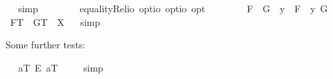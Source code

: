 \begin{isabellebody}
\isadelimproof
\ %
\endisadelimproof
%
\isatagproof
{}\isamarkupfalse%
\ simp\ \isamarkupfalse%
\ %
%
\endisatagproof
{\isafoldproof}%
%
\isadelimproof
%
\endisadelimproof
\ \ \isanewline
\isanewline
\ \isamarkupfalse%
\ equalityRel{}{\isacharcolon}{\isacharcolon}{\isachardoublequoteopen}io\ opt{\isasymRightarrow}io\ opt{\isasymRightarrow}io\ opt{\isachardoublequoteclose}\ {\isacharparenleft}\ {\isachardoublequoteopen}\isactrlbold {\isacharequal}\ {}{}{\isacharparenright}\ \isanewline
\ \ \ \ {\isachardoublequoteopen}F{}\ \isactrlbold {\isacharequal}\ G{}\ {\isasymequiv}\ {\isacharparenleft}\isactrlbold {\isasymlambda}y\ {\isachardot}\ F{}{\isacharparenright}\ \isactrlbold {\isacharequal}\ {\isacharparenleft}\isactrlbold {\isasymlambda}y{\isachardot}\ G{}{\isacharparenright}{\isachardoublequoteclose}\isanewline
\isanewline
\ \isamarkupfalse%
\ {\isachardoublequoteopen}F{}\isactrlsup T\ \isactrlbold {\isacharequal}\ G{}\isactrlsup T\ {\isacharequal}\ X{\isachardoublequoteclose}%
\isadelimproof
\ %
\endisadelimproof
%
\isatagproof
{}\isamarkupfalse%
\ simp\ \isamarkupfalse%
\ %
%
\endisatagproof
{\isafoldproof}%
%
\isadelimproof
%
\endisadelimproof
%
\begin{isamarkuptext}%
Some further tests:%
\end{isamarkuptext}%
\isamarkuptrue%
\ \isamarkupfalse%
\ {\isachardoublequoteopen}{\isacharbrackleft}a\isactrlsup T\ \isactrlbold {\isacharequal}\isactrlsub E\ a\isactrlsup T{\isacharbrackright}\ {\isacharequal}\ {\isasymtop}{\isachardoublequoteclose}%
\isadelimproof
\ %
\endisadelimproof
%
\isatagproof
{}\isamarkupfalse%
\ simp%
\endisatagproof
{\isafoldproof}%
%
\isadelimproof
%
\endisadelimproof

\end{isabellebody}
